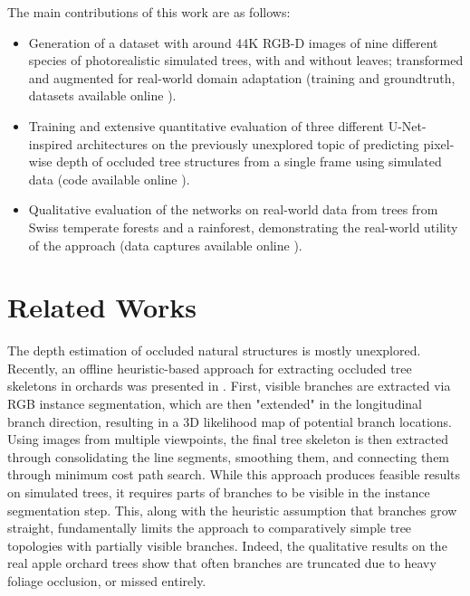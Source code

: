 The main contributions of this work are as follows:
\begin{itemize}
    \item Generation of a dataset with around 44K RGB-D images of nine different species of photorealistic simulated trees, with and without leaves; transformed and augmented for real-world domain adaptation (training and groundtruth, datasets available online \cite{Geckeler2023OBRSupplementary}).
    \item Training and extensive quantitative evaluation of three different U-Net\cite{Weng2015a}-inspired architectures on the previously unexplored topic of predicting pixel-wise depth of occluded tree structures from a single frame using simulated data (code available online \cite{Geckeler2023OBRSupplementary}).
    \item Qualitative evaluation of the networks on real-world data from trees from Swiss temperate forests and a rainforest, demonstrating the real-world utility of the approach (data captures available online \cite{Geckeler2023OBRSupplementary}).
\end{itemize}  

\section{Related Works}


The depth estimation of occluded natural structures is mostly unexplored. Recently, an offline heuristic-based approach for extracting occluded tree skeletons in orchards was presented in \cite{Kim2023}. First, visible branches are extracted via RGB instance segmentation, which are then "extended" in the longitudinal branch direction, resulting in a 3D likelihood map of potential branch locations. Using images from multiple viewpoints, the final tree skeleton is then extracted through consolidating the line segments, smoothing them, and connecting them through minimum cost path search. While this approach produces feasible results on simulated trees, it requires parts of branches to be visible in the instance segmentation step. This, along with the heuristic assumption that branches grow straight, fundamentally limits the approach to comparatively simple tree topologies with partially visible branches. Indeed, the qualitative results on the real apple orchard trees show that often branches are truncated due to heavy foliage occlusion, or missed entirely.

